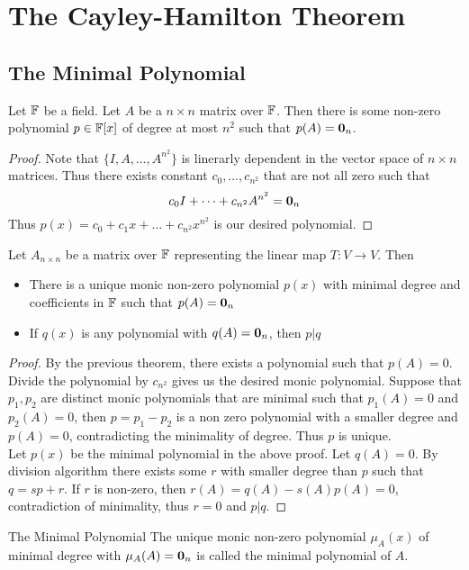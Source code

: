 \documentclass[a4paper]{article}
\begin{document}
\pagebreak
\section{The Cayley-Hamilton Theorem}
\subsection{The Minimal Polynomial}
\begin{thm}{}{} Let $\mathbb{F}$ be a field. Let $A$ be a $n\times n$ matrix over $\mathbb{F}$. Then there is some non-zero polynomial $p\in\mathbb{F}[x]$ of degree at most $n^2$ such that $p(A)=\vb{0}_n$. \begin{proof} Note that $\{I,A,\dots,A^{n^2}\}$ is linerarly dependent in the vector space of $n\times n$ matrices. Thus there exists constant $c_0,\dots,c_{n^2}$ that are not all zero such that $$c_0I+\dots+c_{n^2}A^{n^2}=\vb{0}_n$$ Thus $p(x)=c_0+c_1x+\dots+c_{n^2}x^{n^2}$ is our desired polynomial. 
\end{proof}
\end{thm}

\begin{thm}{}{} Let $A_{n\times n}$ be a matrix over $\mathbb{F}$ representing the linear map $T:V\to V$. Then 
\begin{itemize}
\item There is a unique monic non-zero polynomial $p(x)$ with minimal degree and coefficients in $\mathbb{F}$ such that $p(A)=\vb{0}_n$
\item If $q(x)$ is any polynomial with $q(A)=\vb{0}_n$, then $p|q$
\end{itemize}\begin{proof} By the previous theorem, there exists a polynomial such that $p(A)=0$. Divide the polynomial by $c_{n^2}$ gives us the desired monic polynomial. Suppose that $p_1,p_2$ are distinct monic polynomials that are minimal such that $p_1(A)=0$ and $p_2(A)=0$, then $p=p_1-p_2$ is a non zero polynomial with a smaller degree and $p(A)=0$, contradicting the minimality of degree. Thus $p$ is unique. \\
Let $p(x)$ be the minimal polynomial in the above proof. Let $q(A)=0$. By division algorithm there exists some $r$ with smaller degree than $p$ such that $q=sp+r$. If $r$ is non-zero, then $r(A)=q(A)-s(A)p(A)=0$, contradiction of minimality, thus $r=0$ and $p|q$. 
\end{proof}
\end{thm}

\begin{defn}{The Minimal Polynomial}{} The unique monic non-zero polynomial $\mu_A(x)$ of minimal degree with $\mu_A(A)=\vb{0}_n$ is called the minimal polynomial of $A$. 
\end{defn}
\end{document}

